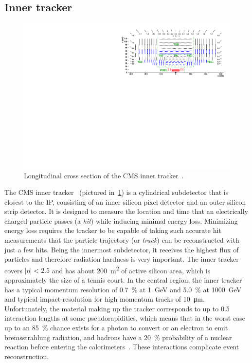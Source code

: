 \subsection{Inner tracker}
\begin{figure}[htb]
  \includegraphics[width=\textwidth]{figures/tracker}
  \caption[Longitudinal cross section of the CMS inner tracker]{Longitudinal cross section of the CMS inner tracker~\cite{Chatrchyan:2014fea}.}
  \label{fig:tracker}
\end{figure}
The CMS inner tracker~\cite{tracker1,tracker2} (pictured in~\cref{fig:tracker})
is a cylindrical subdetector that is closest to the IP, consisting of an inner
silicon pixel detector and an outer silicon strip detector. It is designed to
measure the location and time that an electrically charged particle passes (a
\textit{hit}) while inducing minimal energy loss. Minimizing energy loss
requires the tracker to be capable of taking such accurate hit measurements that
the particle trajectory (or \textit{track}) can be reconstructed with just a few
hits. Being the innermost subdetector, it receives the highest flux of particles
and therefore radiation hardness is very important. The inner tracker covers
$|\eta|<2.5$ and has about \SI{200}{\meter^2} of active silicon area, which is
approximately the size of a tennis court. In the central region, the inner
tracker has a typical momentum resolution of \SI{0.7}{\percent} at \SI{1}{GeV}
and \SI{5.0}{\percent} at \SI{1000}{GeV}~\cite{Khachatryan:2010pw} and typical
impact-resolution for high momentum tracks of \SI{10}{\micro\meter}.
Unfortunately, the material making up the tracker corresponds to up to 0.5
interaction lengths at some pseudorapidities, which means that in the worst case
up to an \SI{85}{\percent} chance exists for a photon to convert or an electron
to emit bremsstrahlung radiation, and hadrons have a \SI{20}{\percent}
probability of a nuclear reaction before entering the
calorimeters~\cite{Sirunyan:2017ulk}. These interactions complicate event
reconstruction.

